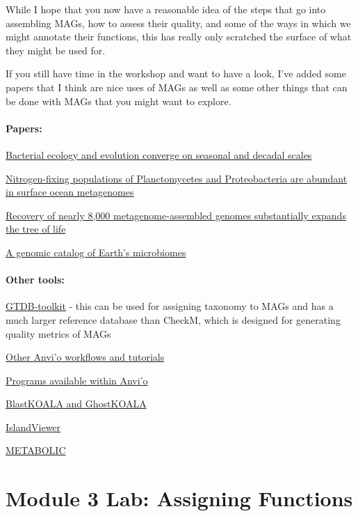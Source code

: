 \documentclass[
]{book}
\begin{document}
While I hope that you now have a reasonable idea of the steps that go into assembling MAGs, how to assess their quality, and some of the ways in which we might annotate their functions, this has really only scratched the surface of what they might be used for.

If you still have time in the workshop and want to have a look, I've added some papers that I think are nice uses of MAGs as well as some other things that can be done with MAGs that you might want to explore.

\subsubsection{Papers:}\label{papers}

\href{https://www.biorxiv.org/content/10.1101/2024.02.06.579087v1}{Bacterial ecology and evolution converge on seasonal and decadal scales}

\href{https://www.nature.com/articles/s41564-018-0176-9}{Nitrogen-fixing populations of Planctomycetes and Proteobacteria are abundant in surface ocean metagenomes}

\href{https://www.nature.com/articles/s41564-017-0012-7}{Recovery of nearly 8,000 metagenome-assembled genomes substantially expands the tree of life}

\href{https://www.nature.com/articles/s41587-020-0718-6}{A genomic catalog of Earth's microbiomes}

\subsubsection{Other tools:}\label{other-tools}

\href{https://github.com/Ecogenomics/GTDBTk}{GTDB-toolkit} - this can be used for assigning taxonomy to MAGs and has a much larger reference database than CheckM, which is designed for generating quality metrics of MAGs

\href{https://anvio.org/learn/}{Other Anvi'o workflows and tutorials}

\href{https://anvio.org/help/main/}{Programs available within Anvi'o}

\href{http://kegg.jp/ghostkoala/}{BlastKOALA and GhostKOALA}

\href{https://www.pathogenomics.sfu.ca/islandviewer}{IslandViewer}

\href{https://microbiomejournal.biomedcentral.com/articles/10.1186/s40168-021-01213-8}{METABOLIC}

\chapter{Module 3 Lab: Assigning Functions}\label{module-3-lab-assigning-functions}
\end{document}
